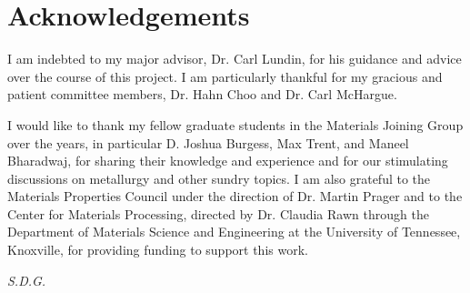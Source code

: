 \chapter*{Acknowledgements}
I am indebted to my major advisor, Dr. Carl Lundin, for his guidance and advice over the course of this project. I am particularly thankful for my gracious and patient committee members, Dr. Hahn Choo and Dr. Carl McHargue. 

I would like to thank my fellow graduate students in the Materials Joining Group over the years, in particular D. Joshua Burgess, Max Trent, and Maneel Bharadwaj, for sharing their knowledge and experience and for our stimulating discussions on metallurgy and other sundry topics. I am also grateful to the Materials Properties Council under the direction of Dr. Martin Prager and to the Center for Materials Processing, directed by Dr. Claudia Rawn through the Department of Materials Science and Engineering at the University of Tennessee, Knoxville, for providing funding to support this work.

\vfill
\centerline{\emph{S.D.G.}}